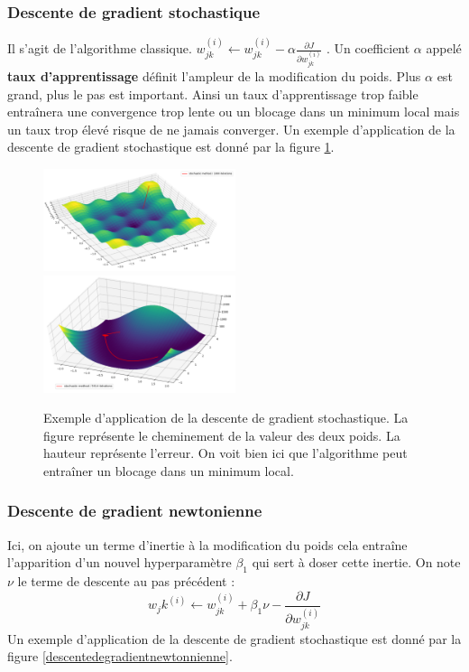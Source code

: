 \subsubsection{Descente de gradient stochastique}
Il s'agit de l'algorithme classique.  $w_{jk}^{(i)} \leftarrow w_{jk}^{(i)} - \alpha \frac{\partial J}{\partial w_{jk}^{(i)}}$ . Un coefficient $\alpha$ appelé \textbf{taux d'apprentissage} définit l'ampleur de la modification du poids. Plus $\alpha$ est grand, plus le pas est important. Ainsi un taux d'apprentissage trop faible entraînera une convergence trop lente ou un blocage dans un minimum local mais un taux trop élevé risque de ne jamais converger. Un exemple d'application de la descente de gradient stochastique est donné par la figure \ref{descentedegradientstochastique}.

\begin{figure}[!h]
\centering
\includegraphics[width=160pt]{"images/MLP/descentedegradientstochastique"}
\hspace*{5mm}
\includegraphics[width=160pt]{"images/MLP/descentedegradientstochastiquepropre"}
\caption{Exemple d'application de la descente de gradient stochastique. La figure représente le cheminement de la valeur des deux poids. La hauteur représente l'erreur. On voit bien ici que l'algorithme peut entraîner un blocage dans un minimum local.}
\label{descentedegradientstochastique}
\end{figure}



\subsubsection{Descente de gradient newtonienne}
Ici, on ajoute un terme d'inertie à la modification du poids cela entraîne l'apparition d'un nouvel hyperparamètre $\beta_1$ qui sert à doser cette inertie. On note $\nu$ le terme de descente au pas précédent : $$ w_j{k}^{(i)} \leftarrow w_{jk}^{(i)} + \beta_1 \nu - \frac{\partial J}{\partial w_{jk}^{(i)}}$$
Un exemple d'application de la descente de gradient stochastique est donné par la figure \ref{descentedegradientnewtonnienne}.
	
